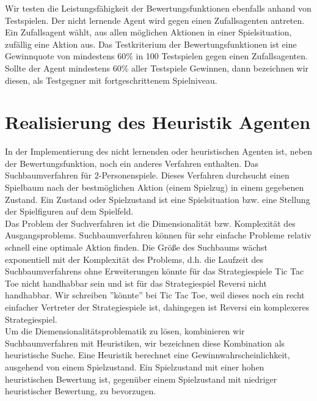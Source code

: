 Wir testen die Leistungsfähigkeit der Bewertungsfunktionen ebenfalls anhand von Testspielen. Der nicht lernende Agent wird gegen einen Zufallsagenten antreten. Ein Zufallsagent wählt, aus allen möglichen Aktionen in einer Spielsituation, zufällig eine Aktion aus. Das Testkriterium der Bewertungsfunktionen ist eine Gewinnquote von mindestens 60\% in 100 Testspielen gegen einen Zufallsagenten. Sollte der Agent mindestens 60\% aller Testspiele Gewinnen, dann bezeichnen wir diesen, als Testgegner mit fortgeschrittenem Spielniveau. \\

\section{Realisierung des Heuristik Agenten}
In der Implementierung des nicht lernenden oder heuristischen Agenten ist, neben der Bewertungsfunktion, noch ein anderes Verfahren enthalten. Das Suchbaumverfahren für 2-Personenspiele. Dieses Verfahren durchsucht einen Spielbaum nach der bestmöglichen Aktion (einem Spielzug) in einem gegebenen Zustand. Ein Zustand oder Spielzustand ist eine Spielsituation bzw. eine Stellung der Spielfiguren auf dem Spielfeld. \\

Das Problem der Suchverfahren ist die Dimensionalität bzw. Komplexität des Ausgangsproblems. Suchbaumverfahren können für sehr einfache Probleme relativ schnell eine optimale Aktion finden. Die Größe des Suchbaums wächst exponentiell mit der Komplexität des Problems, d.h. die Laufzeit des Suchbaumverfahrens ohne Erweiterungen könnte für das Strategiespiele Tic Tac Toe nicht handhabbar sein und ist für das Strategiespiel Reversi nicht handhabbar. Wir schreiben ''könnte'' bei Tic Tac Toe, weil dieses noch ein recht einfacher Vertreter der Strategiespiele ist, dahingegen ist Reversi ein komplexeres Strategiespiel. \\

Um die Diemensionalitätsproblematik zu lösen, kombinieren wir Suchbaumverfahren mit Heuristiken, wir bezeichnen diese Kombination als heuristische Suche. Eine Heuristik berechnet eine Gewinnwahrscheinlichkeit, ausgehend von einem Spielzustand. Ein Spielzustand mit einer hohen heuristischen Bewertung ist, gegenüber einem Spielzustand mit niedriger heuristischer Bewertung, zu bevorzugen. \\

